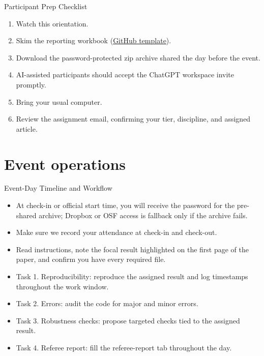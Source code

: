 \documentclass[aspectratio=169,professionalfonts]{beamer}
\begin{document}
\begin{frame}{Participant Prep Checklist}
  \begin{enumerate}
    \item Watch this orientation.
    \item Skim the reporting workbook (\href{https://github.com/I4Replication/AI-vertical/blob/main/Reports/Replication_Log_Referee_Template.xlsx}{GitHub template}).
    \item Download the password-protected zip archive shared the day before the event.
    \item AI-assisted participants should accept the ChatGPT workspace invite promptly.
    \item Bring your usual computer.
    \item Review the assignment email, confirming your tier, discipline, and assigned article.
  \end{enumerate}
\end{frame}

\section{Event operations}

\begin{frame}{Event-Day Timeline and Workflow}
  \begin{itemize}
    \item At check-in or official start time, you will receive the password for the pre-shared archive; Dropbox or OSF access is fallback only if the archive fails.
    \item Make sure we record your attendance at check-in and check-out.
    \item Read instructions, note the focal result highlighted on the first page of the paper, and confirm you have every required file.
    \item Task 1. Reproducibility: reproduce the assigned result and log timestamps throughout the work window.
    \item Task 2. Errors: audit the code for major and minor errors.
    \item Task 3. Robustness checks: propose targeted checks tied to the assigned result.
    \item Task 4. Referee report: fill the referee-report tab throughout the day.
  \end{itemize}
\end{frame}
\end{document}
